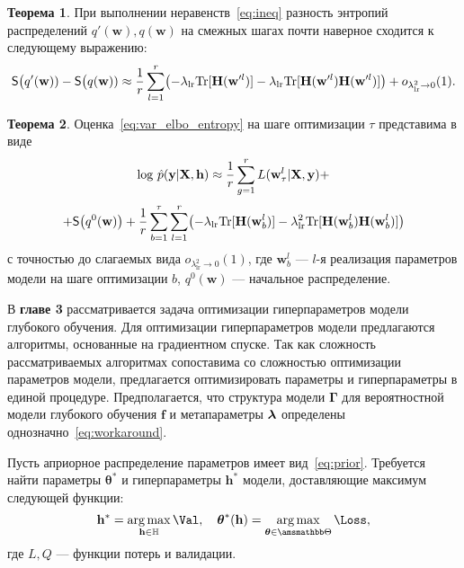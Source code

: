 \documentclass[11pt, a5paper]{dissert}
\theoremstyle{definition}
\newtheorem{theorem}{Теорема}
\DeclareMathOperator*{\argmax}{arg\,max}
\begin{document}
{\begin{theorem}
При выполнении неравенств~\eqref{eq:ineq} разность энтропий распределений $q'(\mathbf{w}), q(\mathbf{w})$ на смежных шагах почти наверное сходится к следующему выражению: 
\begin{equation}
\label{eq:entropy}
	\mathsf{S}\bigl(q'(\mathbf{w})) -  \mathsf{S}\bigl(q(\mathbf{w}))  \approx  \frac{1}{r}\sum_{l=1}^r \bigl(-\lambda_{\text{lr}} \textnormal{Tr}[\mathbf{H}(\mathbf{w}'^l)] - \lambda_{\text{lr}} \textnormal{Tr}[\mathbf{H}(\mathbf{w}'^l)\mathbf{H}(\mathbf{w}'^l)]  \bigr) + o_{\lambda_{\text{lr}}^2 \to 0}(1).
\end{equation}
\end{theorem}


\begin{theorem}\label{st:st2}
Оценка~\eqref{eq:var_elbo_entropy} на шаге оптимизации $\tau$ представима в виде
\begin{equation}
\label{eq:ev_grad_full}
\textnormal{log}~\hat{p}(\mathbf{y}|\mathbf{X}, \mathbf{h}) \approx \frac{1}{r} \sum_{g = 1}^r L(\mathbf{w}^l_\tau| \mathbf{X}, \mathbf{y})  + 
\end{equation}
\[
+\mathsf{S}\big(q^0(\mathbf{w})\bigr) + \frac{1}{r}\sum_{b=1}^\tau\sum_{l=1}^r \bigl(-\lambda_{\text{lr}} \textnormal{Tr}[\mathbf{H}(\mathbf{w}_b^l)] - \lambda_{\text{lr}}^2 \textnormal{Tr}[\mathbf{H}(\mathbf{w}_b^l)\mathbf{H}(\mathbf{w}_b^l)]  \bigr) 
\]
с точностью до слагаемых вида $o_{\lambda_{\text{lr}}^2 \to 0}(1)$,
где $\mathbf{w}_b^l$ --- $l$-я реализация параметров модели на шаге оптимизации $b$, $q^0(\mathbf{w})$ --- начальное распределение.
\end{theorem}

В \textbf{главе 3} рассматривается задача оптимизации гиперпараметров модели глубокого обучения. Для оптимизации гиперпараметров модели предлагаются алгоритмы, основанные на градиентном спуске. Так как сложность рассматриваемых алгоритмах сопоставима со сложностью оптимизации параметров модели, предлагается оптимизировать параметры и гиперпараметры в единой процедуре.%
Предполагается, что структура модели $\boldsymbol{\Gamma}$ для вероятностной модели глубокого обучения $\mathbf{f}$ и метапараметры $\boldsymbol{\lambda}$ определены однозначно~\eqref{eq:workaround}.

Пусть априорное распределение параметров имеет вид~\eqref{eq:prior}. Требуется найти параметры ${\boldsymbol{\theta}}^{*}$ и гиперпараметры $\mathbf{h}^{*}$ модели, доставляющие максимум следующей функции:
\begin{equation}
\label{eq:main}
    \mathbf{h}^{*} = \argmax_{\mathbf{h} \in \mathbb{H}} \Val, \quad \boldsymbol{\theta}^{*}(\mathbf{h}) =  \argmax_{\boldsymbol{\theta} \in \Tetab} \Loss,
\end{equation}
где $L,Q$ --- функции потерь и валидации.


}
\end{document}
